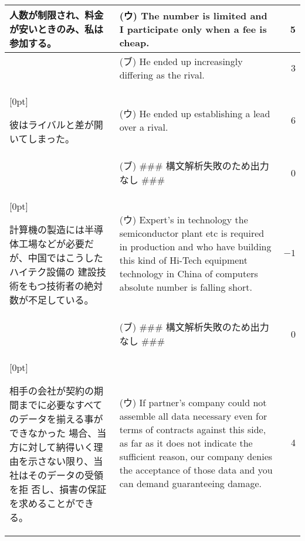 \begin{table}[hb]
\begin{center}
\begin{tabular}{|l|p{}|r|}
{\begin{minipage}{0.35\columnwidth}
人数が制限され、料金が安いときのみ、私は参加する。
\end{minipage}} 
& (ウ) The number is limited and I participate only when a fee is cheap. 
& 5 \\\hline
& (ブ) He ended up increasingly differing as the rival. & 3 \\\cline{2-3}
\raisebox{1.5ex}[0pt]{\begin{minipage}{0.35\columnwidth}
彼はライバルと差が開いてしまった。
\end{minipage}} 
& (ウ) He ended up establishing a lead over a rival. & 6 \\\hline
& (ブ) \#\#\# 構文解析失敗のため出力なし \#\#\# & 0 \\\cline{2-3}
\raisebox{-2.5ex}[0pt]{\begin{minipage}{0.35\columnwidth}
計算機の製造には半導体工場などが必要だが、中国ではこうしたハイテク設備の
建設技術をもつ技術者の絶対数が不足している。
\end{minipage}}
& (ウ) Expert's in technology the semiconductor plant etc is required in 
production and who have building this kind of Hi-Tech equipment technology 
in China of computers absolute number is falling short. & $-1$  \\\hline
& (ブ) \#\#\# 構文解析失敗のため出力なし \#\#\# &0  \\\cline{2-3}
\raisebox{-4.5ex}[0pt]{\begin{minipage}{0.35\columnwidth}
相手の会社が契約の期間までに必要なすべてのデータを揃える事ができなかった
場合、当方に対して納得いく理由を示さない限り、当社はそのデータの受領を拒
否し、損害の保証を求めることができる。
\end{minipage}}
& (ウ) If partner's company could not assemble all data necessary even for 
terms of contracts against this side, as far as it does not indicate the 
sufficient reason, our company denies the acceptance of those data and 
you can demand guaranteeing damage. & 4 \\\hline
\end{tabular}
\end{center}
\end{table}


